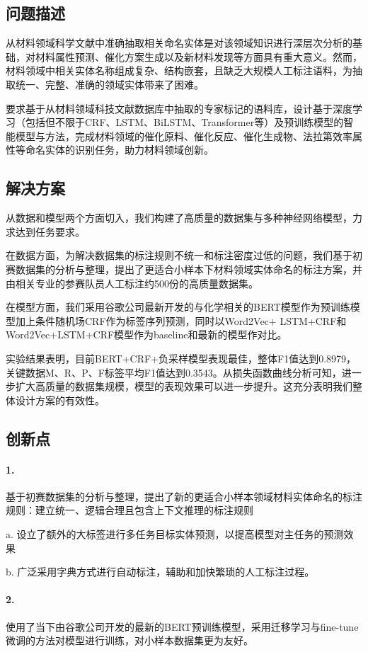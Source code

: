 \documentclass{article}
\begin{document}
	\subsection{问题描述}
	
	从材料领域科学文献中准确抽取相关命名实体是对该领域知识进行深层次分析的基础，对材料属性预测、催化方案生成以及新材料发现等方面具有重大意义。然而，材料领域中相关实体名称组成复杂、结构嵌套，且缺乏大规模人工标注语料，为抽取统一、完整、准确的领域实体带来了困难。
	
	
	要求基于从材料领域科技文献数据库中抽取的专家标记的语料库，设计基于深度学习（包括但不限于CRF、LSTM、BiLSTM、Transformer等）及预训练模型的智能模型与方法，完成材料领域的催化原料、催化反应、催化生成物、法拉第效率属性等命名实体的识别任务，助力材料领域创新。
	
	
	\subsection{解决方案}
	
	
	从数据和模型两个方面切入，我们构建了高质量的数据集与多种神经网络模型，力求达到任务要求。
	
	
在数据方面，为解决数据集的标注规则不统一和标注密度过低的问题，我们基于初赛数据集的分析与整理，提出了更适合小样本下材料领域实体命名的标注方案，并由相关专业的参赛队员人工标注约500份的高质量数据集。


在模型方面，我们采用谷歌公司最新开发的与化学相关的BERT模型作为预训练模型加上条件随机场CRF作为标签序列预测，同时以Word2Vec+ LSTM+CRF和Word2Vec+LSTM+CRF模型作为baseline和最新的模型作对比。


实验结果表明，目前BERT+CRF+负采样模型表现最佳，整体F1值达到0.8979，关键数据M、R、P、F标签平均F1值达到0.3543。从损失函数曲线分析可知，进一步扩大高质量的数据集规模，模型的表现效果可以进一步提升。这充分表明我们整体设计方案的有效性。
		\subsection{创新点}
	\paragraph{1.} 基于初赛数据集的分析与整理，提出了新的更适合小样本领域材料实体命名的标注规则：建立统一、逻辑合理且包含上下文推理的标注规则
	
	
	a. 设立了额外的大标签进行多任务目标实体预测，以提高模型对主任务的预测效果
	
	
	b. 广泛采用字典方式进行自动标注，辅助和加快繁琐的人工标注过程。
\paragraph{2.} 使用了当下由谷歌公司开发的最新的BERT预训练模型，采用迁移学习与fine-tune微调的方法对模型进行训练，对小样本数据集更为友好。
\end{document}
